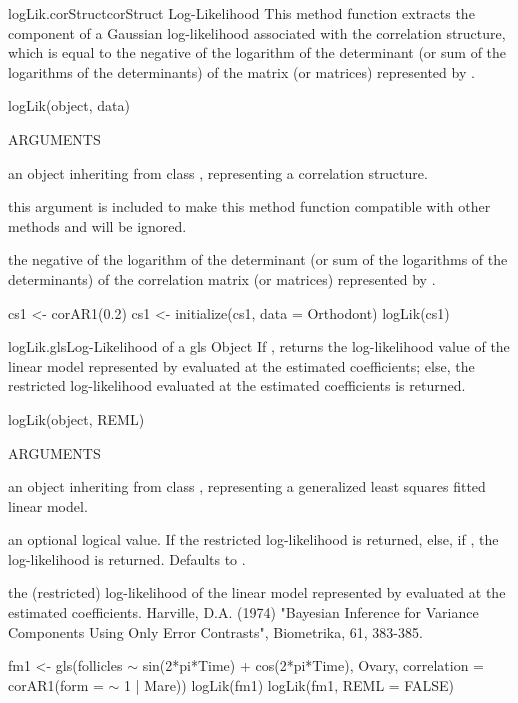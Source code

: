 \documentclass[pdftex]{article} \usepackage{url,graphicx}
\renewcommand{\Twiddle}{\mbox{\(\sim\)}}
\begin{document}
\begin{Helpfile}{logLik.corStruct}{corStruct Log-Likelihood}
This method function extracts the component of a Gaussian
log-likelihood associated with the correlation structure, which is
equal to the negative of the logarithm of the determinant (or sum of
the logarithms of the determinants) of the matrix (or matrices)
represented by .
\begin{Example}
logLik(object, data)
\end{Example}
\begin{Argument}{ARGUMENTS}
\item[\Co{object:}]
an object inheriting from class ,
representing a correlation structure.
\item[\Co{data:}]
this argument is included to make this method function
compatible with other  methods and will be ignored.
\end{Argument}
the negative of the logarithm of the determinant (or sum of
the logarithms of the determinants) of the correlation matrix (or
matrices) represented by .
\need 15pt
\vspace{-16pt} 
\begin{Example}
cs1 <- corAR1(0.2)
cs1 <- initialize(cs1, data = Orthodont)
logLik(cs1)
\end{Example}
\end{Helpfile}
\begin{Helpfile}{logLik.gls}{Log-Likelihood of a gls Object}
If , returns the log-likelihood value of the linear
model represented by  evaluated at the estimated
coefficients; else, the restricted log-likelihood evaluated at the
estimated coefficients is returned.
\begin{Example}
logLik(object, REML)
\end{Example}
\begin{Argument}{ARGUMENTS}
\item[\Co{object:}]
an object inheriting from class , representing
a generalized least squares fitted linear model.
\item[\Co{REML:}]
an optional logical value. If  the restricted
log-likelihood is returned, else, if , the log-likelihood
is returned. Defaults to . 
\end{Argument}
the (restricted) log-likelihood of the linear model represented by
 evaluated at the estimated coefficients.
Harville, D.A. (1974) "Bayesian Inference for Variance Components
Using Only Error Contrasts", Biometrika, 61, 383-385.
\need 15pt
\vspace{-16pt}
\begin{Example}
fm1 <- gls(follicles {\Twiddle} sin(2*pi*Time) + cos(2*pi*Time), Ovary,
           correlation = corAR1(form = {\Twiddle} 1 | Mare))
logLik(fm1)
logLik(fm1, REML = FALSE)
\end{Example}
\end{Helpfile}
\end{document}

